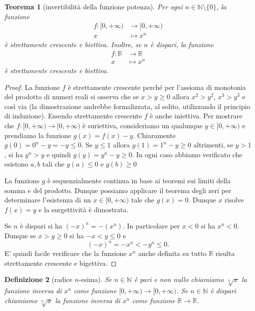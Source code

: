 \documentclass[italian,a4paper,oneside,headinclude]{scrbook}
\newcommand{\NN}{\mathbb N}
\newcommand{\RR}{\mathbb R}
\newtheorem{theorem}{Teorema}
\newtheorem{definition}[theorem]{Definizione}
\begin{document}
\begin{theorem}[invertibilità della funzione potenza]
Per ogni $n\in \NN\setminus\{0\}$, la funzione
\begin{align*}
  f\colon [0,+\infty) &\to [0,+\infty)\\
   x &\mapsto x^n
\end{align*}
è strettamente crescente e biettiva.
Inoltre, se $n$ è dispari, la funzione
\begin{align*}
  f\colon \RR & \to \RR\\
    x &\mapsto x^n
\end{align*}
è strettamente crescente e biettiva.
\end{theorem}
%
\begin{proof}
La funzione $f$ è strettamente crescente perché
per l'assioma di monotonia del prodotto di numeri reali si
osserva che
se $x>y\ge 0$ allora $x^2 > y^2$, $x^3 > y^3$ e così via
(la dimostrazione andrebbe formalizzata, al solito, utilizzando il principio di
induzione).
Essendo strettamente crescente $f$ è anche iniettiva.
Per mostrare che $f\colon [0,+\infty) \to [0,+\infty)$ è suriettiva, consideriamo
un qualunque $y\in[0,+\infty)$ e prendiamo la funzione $g(x)=f(x)-y$.
Chiaramente $g(0) = 0^n - y = -y \le 0$. Se $y\le 1$ allora $g(1) = 1^n - y \ge 0$
altrimenti, se $y>1$, si ha $y^n>y$ e quindi $g(y) = y^n-y \ge 0$.
In ogni caso abbiamo verificato che esistono $a,b$ tali che $g(a)\le 0$ e $g(b)\ge 0$

La funzione $g$ è sequenzialmente continua in base ai teoremi sui limiti
della somma e del prodotto. Dunque possiamo applicare il teorema degli zeri
per determinare l'esistenza di un $x\in[0,+\infty)$ tale che $g(x)=0$.
Dunque $x$ risolve $f(x)=y$ e la surgettività è dimostrata.

Se $n$ è dispari si ha $(-x)^n = -(x^n)$.
In particolare per $x<0$ si ha $x^n<0$. Dunque se $x> y \ge 0$ si
ha $-x < y \le 0$ e
\[
  (-x)^n = -x^n < -y^n \le 0.
\]
E' quindi facile verificare che la funzione $x^n$ anche definita
su tutto $\RR$ risulta strettamente crescente e bigettiva.
\end{proof}

\begin{definition}[radice $n$-esima]
Se $n\in \NN$ è pari e non nullo
chiamiamo $\sqrt[n]{x}$ la funzione
inversa di $x^n$ come funzione $[0,+\infty)\to [0,+\infty)$.
Se $n\in \NN$ è dispari chiamiamo $\sqrt[n]{x}$
la funzione inversa di $x^n$ come funzione $\RR \to \RR$.
\end{definition}
\end{document}
